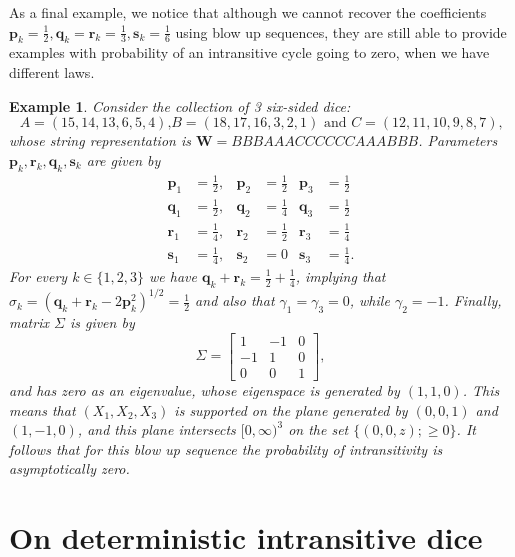 \documentclass[reqno,a4paper,11pt]{amsart}
\newtheorem{example}[lemma]{Example}
\theoremstyle{remark}
\newcommand{\mb}[1]{{\mathbf #1}}
\numberwithin{equation}{section}
\begin{document}
As a final example, we notice that although we cannot recover the coefficients $\mb p_k = \frac{1}{2}, \mb q_k = \mb r_k = \frac{1}{3}, \mb
s_k = \frac{1}{6}$ using blow up sequences, they are still able to provide examples with probability of an intransitive cycle going to zero, when we have different laws.
\begin{example}
\label{ex:blowup_not_intransitive}
Consider the collection of 3 six-sided dice:
\begin{equation*}
\text{$A = (15,14,13,6,5,4)$,
$B = (18,17,16,3,2,1)$ and $C = (12,11,10,9,8,7)$,}
\end{equation*}
whose string representation is $\mb W = BBBAAACCCCCCAAABBB$. Parameters $\mb p_k, \mb r_k, \mb q_k, \mb s_k$ are given by
\begin{align*}
\mb p_1 &= \tfrac{1}{2}, & \mb p_2&= \tfrac{1}{2} & \mb p_3&= \tfrac{1}{2} \\
\mb q_1 &= \tfrac{1}{2}, & \mb q_2&= \tfrac{1}{4} & \mb q_3&= \tfrac{1}{2} \\
\mb r_1 &= \tfrac{1}{4}, & \mb r_2&= \tfrac{1}{2} & \mb r_3&= \tfrac{1}{4} \\
\mb s_1 &= \tfrac{1}{4}, & \mb s_2&= 0            & \mb s_3&= \tfrac{1}{4}.
\end{align*}
For every $k \in \{1,2,3\}$ we have $\mb q_k + \mb r_k = \frac{1}{2} + \frac{1}{4}$, implying that $\sigma_k = (\mb q_k + \mb r_k - 2\mb p_k^2)^{1/2} = \frac{1}{2}$ and also that
$\gamma_1 = \gamma_3 = 0$, while $\gamma_2 = -1$. Finally, matrix $\Sigma$
is given by
\begin{equation*}
    \Sigma = \begin{bmatrix}
        1 & -1 & 0 \\ -1 & 1 & 0 \\ 0 & 0 & 1
    \end{bmatrix},
\end{equation*}
and has zero as an eigenvalue, whose eigenspace is generated by $(1,1,0)$. This means that $(X_1,X_2,X_3)$ is supported on the plane generated by $(0,0,1)$ and $(1,-1,0)$, and this plane intersects $[0,\infty)^3$ on the set $\{(0,0,z); \ge 0\}$. It follows that
for this blow up sequence the probability of intransitivity is asymptotically zero. 
\end{example}

\section{On deterministic intransitive dice}\label{sec:deterministic}
\end{document}
